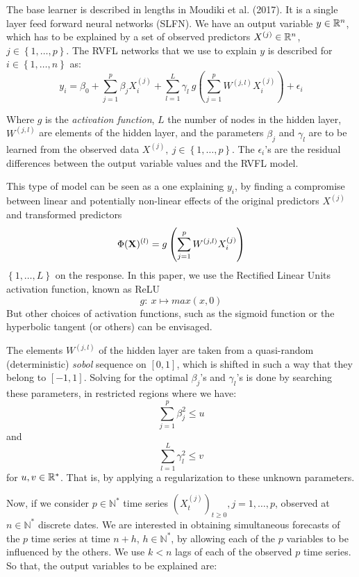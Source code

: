 The base learner is described in lengths in Moudiki et al. (2017). It is a single layer feed forward neural networks (SLFN). We have an output variable $y \in \mathbb{R}^n$, which has to be explained by a set of observed predictors $X^{(j)} \in \mathbb{R}^n$, $j \in \left\lbrace 1, \ldots,
p\right\rbrace$. The RVFL networks that we use to explain $y$ is described for $i \in \left\lbrace 1, \ldots, n\right\rbrace$ as:
$$
y_i = \beta_0 + \sum_{j = 1}^p \beta_j X_i^{(j)} + \sum_{l = 1}^L \gamma_l \:
g\left(\sum_{j = 1}^p W^{(j, l)} X_i^{(j)}\right) + \epsilon_i
$$

\medskip

Where $g$ is the \textit{activation function}, $L$ the number of nodes in the hidden
layer, $W^{(j, l)}$ are elements of the hidden layer, and the parameters
$\beta_j$ and $\gamma_l$ are to be learned from the observed data $X^{(j)}, \: j
\in \left\lbrace 1, \ldots, p\right\rbrace$. The $\epsilon_i$'s are the residual
differences between the output variable values and the RVFL model.

\medskip

This type of model can be seen as a one explaining $y_i$, by finding a
compromise between linear and potentially non-linear effects of the original
predictors $X^{(j)}$ and transformed predictors
$$
\Phi({\bf X})^{(l)}= g\left(\sum_{j = 1}^p W^{(j, l)} X_i^{(j)}\right)
$$
$\left \lbrace 1, \ldots, L\right\rbrace$ on the response. In this paper, we use the Rectified Linear Units activation function, known as ReLU
$$
g: \: x \mapsto max(x, 0)
$$
But other choices of activation functions, such as the sigmoid function or the hyperbolic tangent (or others) can be envisaged.

\medskip

The elements $W^{(j, l)}$ of the hidden layer are taken from a quasi-random (deterministic) \textit{sobol} sequence on $[0, 1]$, which is shifted in such a way that they belong to $[-1, 1]$. Solving for the optimal $\beta_j$'s and $\gamma_l$'s is done by searching these parameters,  in restricted regions where we have:
$$
\sum_{j=1}^p \beta_j^2  \leq u
$$
and
$$
\sum_{l=1}^L
\gamma_l^2 \leq v
$$ for $u, v \in \mathbb{R}^*$. That is, by applying a regularization to these unknown parameters.


\medskip

Now, if we consider $p \in \mathbb{N}^*$ time series $(X_t^{(j)})_{t \geq 0}, j = 1, \ldots, p$,
observed at $n \in \mathbb{N}^*$ discrete dates. We are interested in
obtaining simultaneous forecasts of the $p$ time series at time $n+h$, $h \in
\mathbb{N}^*$, by allowing each of the $p$ variables to be influenced by the
others. We use $k < n$ lags of each of the observed $p$ time
series. So that, the output variables to be explained are:

